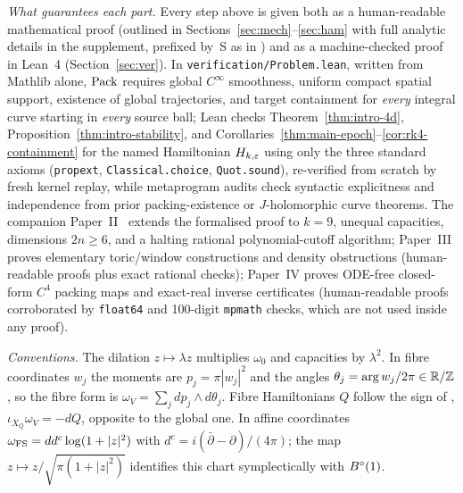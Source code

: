 \emph{What guarantees each part.} Every step above is given both as a human-readable mathematical proof (outlined in
Sections~\ref{sec:mech}--\ref{sec:ham} with full analytic details in the supplement, prefixed by~S as in
) and as a machine-checked proof in Lean~4 (Section~\ref{sec:ver}). In \texttt{verification/Problem.lean},
written from Mathlib alone, $\mathrm{Pack}$ requires global $C^\infty$ smoothness, uniform compact spatial support, existence of
global trajectories, and target containment for \emph{every} integral curve starting in \emph{every} source ball; Lean
checks Theorem~\ref{thm:intro-4d}, Proposition~\ref{thm:intro-stability}, and Corollaries~\ref{thm:main-epoch}--\ref{cor:rk4-containment}
for the named Hamiltonian $H_{k,\varepsilon}$ using only the three standard axioms (\texttt{propext},
\texttt{Classical.choice}, \texttt{Quot.sound}), re-verified from scratch by fresh kernel replay, while metaprogram
audits check syntactic explicitness and independence from prior packing-existence or $J$-holomorphic curve theorems. The
companion Paper~II~\cite{SongHD} extends the formalised proof to $k=9$, unequal capacities, dimensions $2n\ge6$, and a
halting rational polynomial-cutoff algorithm; Paper~III proves elementary toric/window constructions and density
obstructions (human-readable proofs plus exact rational checks); Paper~IV proves ODE-free closed-form $C^4$ packing maps
and exact-real inverse certificates (human-readable proofs corroborated by \texttt{float64} and 100-digit
\texttt{mpmath} checks, which are not used inside any proof).

\emph{Conventions.}\label{sec:intro-conventions} The dilation $z\mapsto\lambda z$ multiplies $\omega_0$ and
capacities by $\lambda^2$. In fibre coordinates $w_j$ the moments are $p_j=\pi|w_j|^2$ and the angles
$\theta_j=\arg w_j/2\pi\in\mathbb{R}/\mathbb{Z}$, so the fibre form is $\omega_V=\sum_jdp_j\wedge d\theta_j$. Fibre Hamiltonians $Q$
follow the sign of \cite{OpenAI2026}, $\iota_{X_Q}\omega_V=-dQ$, opposite to the global one. In affine coordinates
$\omega_{\rm FS}=dd^c\log(1+|z|^2)$ with $d^c=i(\bar\partial-\partial)/(4\pi)$; the map $z\mapsto z/\sqrt{\pi(1+|z|^2)}$
identifies this chart symplectically with $B^{\circ}(1)$.
